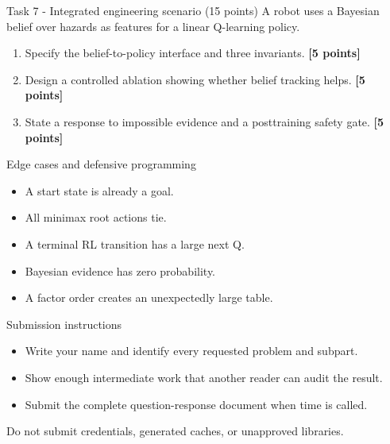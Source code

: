\documentclass[aspectratio=169,11pt]{beamer}
\begin{document}
\begin{frame}{Task 7 - Integrated engineering scenario (15 points)}
\small
A robot uses a Bayesian belief over hazards as features for a linear Q-learning policy.

\vspace{0.2cm}
\begin{enumerate}
\item[\textbf{a.}] Specify the belief-to-policy interface and three invariants. \hfill{\color{courseblue}\textbf{[5 points]}}
\item[\textbf{b.}] Design a controlled ablation showing whether belief tracking helps. \hfill{\color{courseblue}\textbf{[5 points]}}
\item[\textbf{c.}] State a response to impossible evidence and a posttraining safety gate. \hfill{\color{courseblue}\textbf{[5 points]}}
\end{enumerate}
\end{frame}

\begin{frame}{Edge cases and defensive programming}
\small
\begin{itemize}
  \item A start state is already a goal.
  \item All minimax root actions tie.
  \item A terminal RL transition has a large next Q.
  \item Bayesian evidence has zero probability.
  \item A factor order creates an unexpectedly large table.
\end{itemize}
\end{frame}

\begin{frame}{Submission instructions}
\small
\begin{itemize}
  \item Write your name and identify every requested problem and subpart.
  \item Show enough intermediate work that another reader can audit the result.
  \item Submit the complete question-response document when time is called.
\end{itemize}
\vspace{0.2cm}
\alert{Do not submit credentials, generated caches, or unapproved libraries.}
\end{frame}
\end{document}
